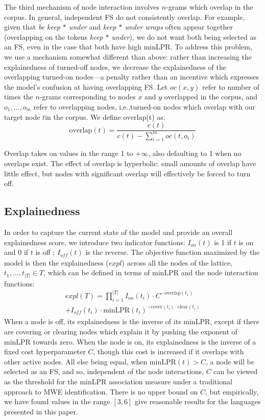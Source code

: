\documentclass[11pt,letterpaper]{article}
\makeatletter
\def \ie {i.e.,\@ }
\newcommand{\dotts}{...}
\newcommand{\gap}{$*$\xspace}
\newcommand{\ex}[1]{\textit{#1}\xspace}
\newcommand{\minLPR}{\ensuremath{\text{minLPR}}}
\newcommand{\cover}{\ensuremath{\text{cover}}\xspace}
\newcommand{\clear}{\ensuremath{\text{clear}}\xspace}
\newcommand{\overlap}{\ensuremath{\text{overlap}}\xspace}
\makeatother
\begin{document}
The third mechanism of node interaction involves $n$-grams which overlap in the corpus. In general, independent FS do not consistently overlap. For example, given that \ex{be keep \gap under} and \ex{keep \gap under wraps} often appear together (overlapping on the tokens \ex{keep \gap under}), we do not want both being selected as an FS, even in the case that both have high minLPR. To address this problem, we use a mechanism somewhat different than above: rather than increasing the explainedness of turned-off nodes, we decrease the explainedness of the overlapping turned-on nodes---a penalty rather than an incentive which expresses the model's confusion at having overlapping FS. Let $\mathit{oc}(x,y)$ refer to number of times the $n$-grams corresponding to nodes $x$ and $y$ overlapped in the corpus, and $o_1,\dotts,o_m$ refer to overlapping nodes, \ie turned-on nodes which overlap with our target node $t$in the corpus. We define \overlap(t) as:
\begin{displaymath}
	\overlap(t) = \frac{c(t)}{c(t) - \sum_{i=1}^{m}{\mathit{oc}(t,o_i)}}
\end{displaymath}

Overlap takes on values in the range 1 to $+\infty$, also defaulting to 1 when no overlaps exist. The effect of overlap is hyperbolic: small amounts of overlap have little effect, but nodes with significant overlap will effectively be forced to turn off. 

\subsection{Explainedness}

In order to capture the current state of the model and provide an overall explainedness score, we introduce two indicator functions: $I_{\mathit{on}}(t)$ is 1 if $t$ is on and 0 if $t$ is off ; $I_{\mathit{off}}(t)$ is the reverse. The objective function maximized by the model is then the explainedness ($\mathit{expl}$) across all the nodes of the lattice, $t_1,\dots,t_{|T|} \in T$, which can be defined in terms of minLPR and the node interaction functions:
%
\begin{multline}
	\mathit{expl}(T) = \prod_{i=1}^{|T|}{I_{\mathit{on}}(t_i)\cdot C^{-\overlap(t_1)}} \\ + I_{\mathit{off}}(t_i)\cdot\minLPR(t_i)^{-\cover(t_i) \cdot \clear(t_i)}
\end{multline}
\noindent
When a node is off, its explainedness is the inverse of its minLPR, except if there are covering or clearing nodes which explain it by pushing the exponent of minLPR towards zero. When the node is on, its explainedness is the inverse of a fixed cost hyperparameter $C$, though this cost is increased if it overlaps with other active nodes. 
All else being equal, when $\minLPR(t) > C$, a node will be selected as an FS, and so, independent of the node interactions, $C$ can be viewed as the threshold for the minLPR association measure under a traditional approach to MWE identification. There is no upper bound on $C$, but empirically, we have found values in the range $[3,6]$ give reasonable results for the languages presented in this paper.
\end{document}
